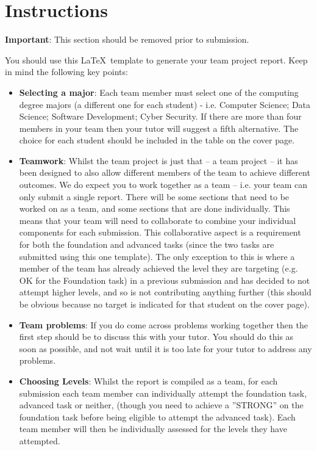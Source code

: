 \documentclass[a4paper, 11pt]{report}
\begin{document}

\tableofcontents


\newpage
\section*{Instructions}

\textbf{Important}: This section should be removed prior to submission.

You should use this \LaTeX\ template to generate your team project report. Keep in mind the following key points:
\begin{itemize}
	\item \textbf{Selecting a major}: Each team member must select one of the computing degree majors (a different one for each student) - i.e. Computer Science; Data Science; Software Development; Cyber Security. If there are more than four members in your team then your tutor will suggest a fifth alternative. The choice for each student should be included in the table on the cover page.
	\item \textbf{Teamwork}: Whilst the team project is just that -- a team project -- it has been designed to also allow different members of the team to achieve different outcomes. We do expect you to work together as a team -- i.e. your team can only submit a single report. There will be some sections that need to be worked on as a team, and some sections that are done individually. This means that your team will need to collaborate to combine your individual components for each submission. This collaborative aspect is a requirement for both the foundation and advanced tasks (since the two tasks are submitted using this one template). The only exception to this is where a member of the team has already achieved the level they are targeting (e.g. OK for the Foundation task) in a previous submission and has decided to not attempt higher levels, and so is not contributing anything further (this should be obvious because no target is indicated for that student on the cover page).
	\item \textbf{Team problems}: If you do come across problems working together then the first step should be to discuss this with your tutor. You should do this as soon as possible, and not wait until it is too late for your tutor to address any problems.
	\item \textbf{Choosing Levels}: Whilst the report is compiled as a team, for each submission each team member can individually attempt the foundation task, advanced task or neither, (though you need to achieve a ''STRONG'' on the foundation task before being eligible to attempt the advanced task). Each team member will then be individually assessed for the levels they have attempted.\\ 

\end{itemize}
\end{document}
